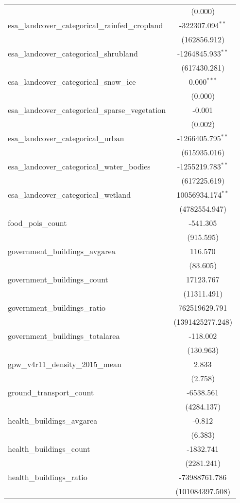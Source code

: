 \begin{table}[!htbp]
\begin{tabular}{@{\extracolsep{5pt}}lc}
  & (0.000) \\
 esa_landcover_categorical_rainfed_cropland & -322307.094$^{**}$ \\
  & (162856.912) \\
 esa_landcover_categorical_shrubland & -1264845.933$^{**}$ \\
  & (617430.281) \\
 esa_landcover_categorical_snow_ice & 0.000$^{***}$ \\
  & (0.000) \\
 esa_landcover_categorical_sparse_vegetation & -0.001$^{}$ \\
  & (0.002) \\
 esa_landcover_categorical_urban & -1266405.795$^{**}$ \\
  & (615935.016) \\
 esa_landcover_categorical_water_bodies & -1255219.783$^{**}$ \\
  & (617225.619) \\
 esa_landcover_categorical_wetland & 10056934.174$^{**}$ \\
  & (4782554.947) \\
 food_pois_count & -541.305$^{}$ \\
  & (915.595) \\
 government_buildings_avgarea & 116.570$^{}$ \\
  & (83.605) \\
 government_buildings_count & 17123.767$^{}$ \\
  & (11311.491) \\
 government_buildings_ratio & 762519629.791$^{}$ \\
  & (1391425277.248) \\
 government_buildings_totalarea & -118.002$^{}$ \\
  & (130.963) \\
 gpw_v4r11_density_2015_mean & 2.833$^{}$ \\
  & (2.758) \\
 ground_transport_count & -6538.561$^{}$ \\
  & (4284.137) \\
 health_buildings_avgarea & -0.812$^{}$ \\
  & (6.383) \\
 health_buildings_count & -1832.741$^{}$ \\
  & (2281.241) \\
 health_buildings_ratio & -73988761.786$^{}$ \\
  & (101084397.508) \\

\end{tabular}
\end{table}
